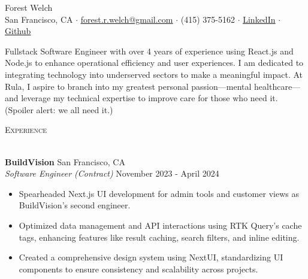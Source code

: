 \documentclass[a4paper]{article}
\newcommand{\header}[1]{
    {\hspace*{-18pt}\vspace*{3pt} \textcolor{deeppurple}{\textsc{#1}}}
    \vspace*{-12pt} \\
    \hspace*{-18pt} \textcolor{deeppurple}{\hrulefill} \\
}
\begin{document}
\vspace{-40pt}

\begin{center}
    {\fontsize{36}{36}\selectfont \textcolor{deeppurple}{Forest Welch}} \\ %
    \vspace{10pt} %
    \small San Francisco, CA $\cdot$ \href{mailto:forest.r.welch@gmail.com}{\underline{forest.r.welch@gmail.com}} $\cdot$ (415) 375-5162 $\cdot$ \href{https://linkedin.com/in/forestrwelch}{\underline{LinkedIn}} $\cdot$ \href{https://github.com/nwelchr}{\underline{Github}}
\end{center}


\begin{center}
    Fullstack Software Engineer with over 4 years of experience using React.js and Node.js to enhance operational efficiency and user experiences. I am dedicated to integrating technology into underserved sectors to make a meaningful impact. At Rula, I aspire to branch into my greatest personal passion—mental healthcare—and leverage my technical expertise to improve care for those who need it. (Spoiler alert: we all need it.)
\end{center}


\header{Experience}
\vspace{1mm}

\textbf{BuildVision} \hfill San Francisco, CA\\
\textit{Software Engineer (Contract)} \hfill November 2023 - April 2024\\
\vspace{-1mm}
\begin{itemize} \itemsep .5pt
    \item Spearheaded Next.js UI development for admin tools and customer views as BuildVision's second engineer.
    \item Optimized data management and API interactions using RTK Query's cache tags, enhancing features like result caching, search filters, and inline editing.
    \item Created a comprehensive design system using NextUI, standardizing UI components to ensure consistency and scalability across projects.
\end{itemize}
\end{document}
